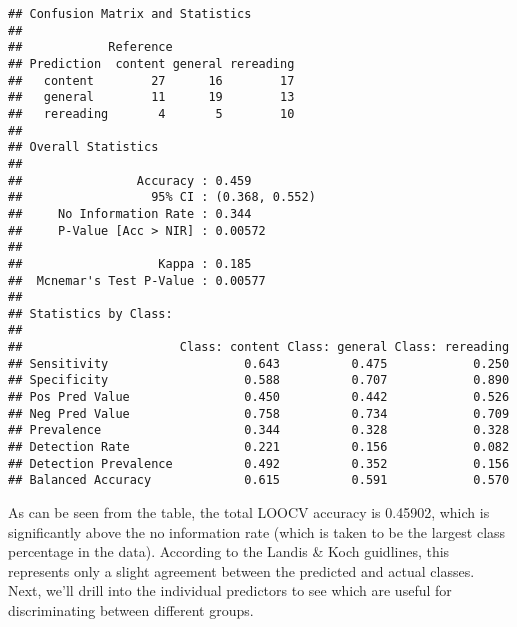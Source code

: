 \documentclass[12pt,]{article}
\newenvironment{Shaded}{\begin{snugshade}}{\end{snugshade}}
\newcommand{\DataTypeTok}[1]{\textcolor[rgb]{0.13,0.29,0.53}{#1}}
\newcommand{\KeywordTok}[1]{\textcolor[rgb]{0.13,0.29,0.53}{\textbf{#1}}}
\newcommand{\NormalTok}[1]{#1}
\newcommand{\OperatorTok}[1]{\textcolor[rgb]{0.81,0.36,0.00}{\textbf{#1}}}
\newcommand{\StringTok}[1]{\textcolor[rgb]{0.31,0.60,0.02}{#1}}
\begin{document}
\begin{Shaded}
\end{Shaded}

\begin{verbatim}
## Confusion Matrix and Statistics
## 
##            Reference
## Prediction  content general rereading
##   content        27      16        17
##   general        11      19        13
##   rereading       4       5        10
## 
## Overall Statistics
##                                         
##                Accuracy : 0.459         
##                  95% CI : (0.368, 0.552)
##     No Information Rate : 0.344         
##     P-Value [Acc > NIR] : 0.00572       
##                                         
##                   Kappa : 0.185         
##  Mcnemar's Test P-Value : 0.00577       
## 
## Statistics by Class:
## 
##                      Class: content Class: general Class: rereading
## Sensitivity                   0.643          0.475            0.250
## Specificity                   0.588          0.707            0.890
## Pos Pred Value                0.450          0.442            0.526
## Neg Pred Value                0.758          0.734            0.709
## Prevalence                    0.344          0.328            0.328
## Detection Rate                0.221          0.156            0.082
## Detection Prevalence          0.492          0.352            0.156
## Balanced Accuracy             0.615          0.591            0.570
\end{verbatim}

As can be seen from the table, the total LOOCV accuracy is 0.45902,
which is significantly above the no information rate (which is taken to
be the largest class percentage in the data). According to the Landis \&
Koch \citep[1977; as reported in][]{salkind_encyclopedia_2007}
guidlines, this represents only a slight agreement between the predicted
and actual classes. Next, we'll drill into the individual predictors to
see which are useful for discriminating between different groups.
\end{document}
